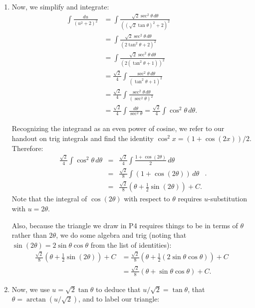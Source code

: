 \documentclass[12pt]{article}
\theoremstyle{definition}
\begin{document}
{\begin{enumerate}[label=P\arabic*.,leftmargin=0.75in]
		\item Now, we simplify and integrate:
		\begin{align*}\int\frac{du}{\left(u^2+2\right)^2} & = \int\frac{\sqrt{2}\sec^2\theta\,d\theta}{\left((\sqrt{2}\tan\theta)^2+2\right)^2} \\ & =  \int\frac{\sqrt{2}\sec^2\theta\,d\theta}{\left(2\tan^2\theta+2\right)^2}\\ & =  \int\frac{\sqrt{2}\sec^2\theta\,d\theta}{\left(2(\tan^2\theta+1)\right)^2}\\ & = \frac{\sqrt{2}}{4}\int\frac{\sec^2\theta\,d\theta}{(\tan^2\theta+1)^2}\\ & =  \frac{\sqrt{2}}{4}\int\frac{\sec^2\theta\,d\theta}{(\sec^2\theta)^2}\\ & =  \frac{\sqrt{2}}{4}\int\frac{d\theta}{\sec^2\theta}=\frac{\sqrt{2}}{4}\int\cos^2\theta\,d\theta.\end{align*}
		
		Recognizing the integrand as an even power of cosine, we refer to our handout on trig integrals and find the identity $\cos^2x=(1+\cos(2x))/2$. Therefore:
		$$\begin{array}{rcl}\frac{\sqrt{2}}{4}\int\cos^2\theta\,d\theta & = & \frac{\sqrt{2}}{4}\int\frac{1+\cos(2\theta)}{2}\,d\theta\\[6mm] & = & \frac{\sqrt{2}}{8}\int\left(1+\cos(2\theta)\right)\,d\theta\\[6mm] & = & \frac{\sqrt{2}}{8}\left(\theta+\frac{1}{2}\sin(2\theta)\right)+C.\end{array}.$$
		Note that the integral of $\cos(2\theta)$ with respect to $\theta$ requires $u$-substitution with $u=2\theta$.
		
		Also, because the triangle we draw in P4 requires things to be in terms of $\theta$ rather than $2\theta$, we do some algebra and trig (noting that $\sin(2\theta)=2\sin\theta\cos\theta$ from the list of identities):
		\begin{align}[rcl]\frac{\sqrt{2}}{8}\left(\theta+\frac{1}{2}\sin(2\theta)\right)+C & = \frac{\sqrt{2}}{8}\left(\theta+\frac{1}{2}(2\sin\theta\cos\theta)\right)+C\nonumber\\ & = \label{ThetaInt2} \frac{\sqrt{2}}{8}\left(\theta+\sin\theta\cos\theta\right)+C.\end{align}
		
		\item Now, we use $u=\sqrt{2}\tan\theta$ to deduce that $u/\sqrt{2}=\tan\theta$, that $\theta=\arctan(u/\sqrt{2})$, and to label our triangle:
		

\end{enumerate}}
\end{document}
